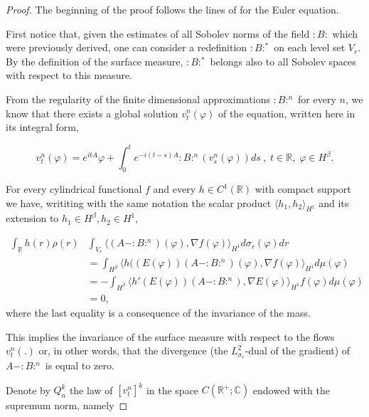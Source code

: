 \documentclass[11pt,leqno]{amsart}
\newcommand{\R}{\mathbb{R}}
\begin{document}
 \begin{proof}

 The beginning of the proof follows the lines of  %
 \cite[Theorem 4.1]{C}  for the Euler equation.

First notice that, given the estimates of all Sobolev norms of the field $:B:$ which were previously derived, one can consider a redefinition $:B:^\ast$ on each level set $V_r$. By the definition of the surface measure, $:B:^\ast$ belongs also to all Sobolev spaces with respect to this measure. 

From the regularity of the finite dimensional approximations $:B:^n$ for every $n$, 
we know that there exists a global solution $v_t^n (\varphi )$ of the equation, written here in its integral form,

\begin{equation} \label{vnphi}
v_t^n (\varphi )= e^{itA}\varphi +\int_0^t e^{-i(t-s)A} :B:^n (v_s^n (\varphi ))ds~, \; t \in \R, \; \varphi \in H^{\beta}.
\end{equation}


For every cylindrical functional $f$ and every $h\in {C^1}(\mathbb R)$ with compact support we have, writiting with the same notation the scalar product
\linebreak 
$\langle h_1 , h_2 \rangle_{H^1}$ and its extension to $h_1 \in H^\beta ,h_2 \in H^1$,



\begin{align*}
\int_{\mathbb R} h(r) \rho (r)& \int_{V_r} \langle (A- :B:^n )(\varphi ), \nabla f (\varphi )\rangle_{H^1} d\sigma_r (\varphi ) dr\\
&=\int_{H^{\beta}} \langle h((E (\varphi )) (A- :B:^n  )(\varphi ), \nabla f (\varphi )\rangle_{H^1}   d\mu (\varphi )\\
&=-\int_{H^{\beta}}  \langle h' (E (\varphi )) (A- :B:^n ), \nabla E (\varphi ) \rangle_{H^1} f (\varphi)  d\mu (\varphi )\\
&=0,
\end{align*}
where the last equality is a consequence of the invariance of the mass.


This implies the invariance of the surface measure with respect to the  flows $v_t^n(.)$ or, in other words, that the divergence (the $L_{\sigma_r}^2$-dual 
of the gradient) of $A-:B:^n$ is equal to zero.





Denote by $Q_n^k$ the law of $[v_t^n ]^k$ in the space $C(\mathbb R^+ ; \mathbb C )$  endowed with the supremum norm, namely


\end{proof}
\end{document}
